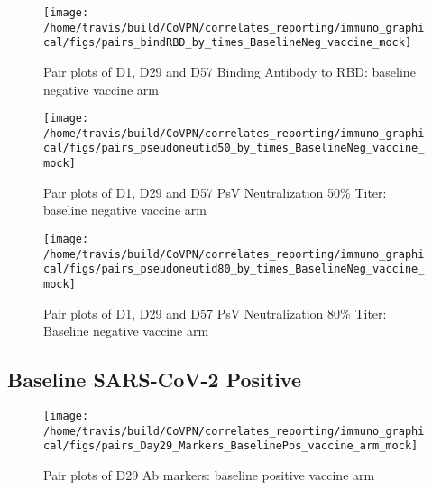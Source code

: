 \documentclass[]{book}
\theoremstyle{definition}
\theoremstyle{definition}
\theoremstyle{definition}
\newcommand{\1}{\mathbbm{1}}
\begin{document}
\begin{figure}[H]

{\centering \texttt{[image: /home/travis/build/CoVPN/correlates\_reporting/immuno\_graphical/figs/pairs\_bindRBD\_by\_times\_BaselineNeg\_vaccine\_mock]} 

}

\caption{Pair plots of D1, D29 and D57 Binding Antibody to RBD: baseline negative vaccine arm}\label{fig:unnamed-chunk-10}
\end{figure}

\begin{figure}[H]

{\centering \texttt{[image: /home/travis/build/CoVPN/correlates\_reporting/immuno\_graphical/figs/pairs\_pseudoneutid50\_by\_times\_BaselineNeg\_vaccine\_mock]} 

}

\caption{Pair plots of D1, D29 and D57 PsV Neutralization 50\% Titer: baseline negative vaccine arm}\label{fig:unnamed-chunk-11}
\end{figure}

\begin{figure}[H]

{\centering \texttt{[image: /home/travis/build/CoVPN/correlates\_reporting/immuno\_graphical/figs/pairs\_pseudoneutid80\_by\_times\_BaselineNeg\_vaccine\_mock]} 

}

\caption{Pair plots of D1, D29 and D57 PsV Neutralization 80\% Titer: Baseline negative vaccine arm}\label{fig:unnamed-chunk-12}
\end{figure}

\hypertarget{baseline-sars-cov-2-positive}{%
\subsection{Baseline SARS-CoV-2 Positive}\label{baseline-sars-cov-2-positive}}

\begin{figure}[H]

{\centering \texttt{[image: /home/travis/build/CoVPN/correlates\_reporting/immuno\_graphical/figs/pairs\_Day29\_Markers\_BaselinePos\_vaccine\_arm\_mock]} 

}

\caption{Pair plots of D29 Ab markers: baseline positive vaccine arm}\label{fig:unnamed-chunk-13}
\end{figure}
\end{document}
